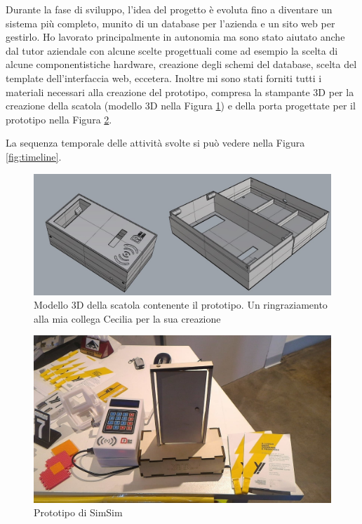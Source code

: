 \documentclass[12pt]{report}
\begin{document}
Durante la fase di sviluppo, l'idea del progetto è evoluta fino a diventare un sistema più completo, munito di un database per l'azienda e un sito web per gestirlo. Ho lavorato principalmente in autonomia ma sono stato aiutato anche dal tutor aziendale con alcune scelte progettuali come ad esempio la scelta di alcune componentistiche hardware, creazione degli schemi del database, scelta del template dell'interfaccia web, eccetera. Inoltre mi sono stati forniti tutti i materiali necessari alla creazione del prototipo, compresa la stampante 3D per la creazione della scatola (modello 3D nella Figura \ref{fig:simsim_3d}) e della porta progettate per il prototipo nella Figura \ref{fig:simsim}.

La sequenza temporale delle attività svolte si può vedere nella Figura \ref{fig:timeline}.

\pagebreak

\vspace*{40px}

\begin{figure}[H]
	\centering
	\includegraphics[width=0.9\linewidth]{./img/simsim_3d.jpeg}
	\caption{Modello 3D della scatola contenente il prototipo. Un ringraziamento alla mia collega Cecilia per la sua creazione}
	\label{fig:simsim_3d}
\end{figure}

\begin{figure}[H]
	\centering
	\includegraphics[width=0.8\linewidth]{./img/simsim.jpg}
	\caption{Prototipo di SimSim}
	\label{fig:simsim}
\end{figure}
\end{document}

